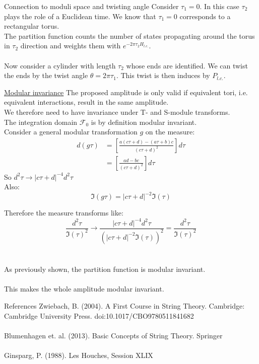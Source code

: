 \documentclass[11pt,aspectratio=169]{beamer}
\begin{document}
\begin{frame}
	
	\begin{block}{Connection to moduli space and twisting angle}
		Consider $\tau_1 = 0$. In this case $\tau_2$ plays the role of a Euclidean time. We know that $\tau_1 = 0$ corresponds to a rectangular torus.
	\\
	The partition function counts the number of states propagating around the torus in $\tau_2$ direction and weights them with $e^{-2\pi\tau_2H_{l.c.}}$.
	\\~\\
	Now consider a cylinder with length $\tau_2$ whose ends are identified. We can twist the ends by the twist angle $\theta = 2\pi \tau_1$. This twist is then induces by $P_{l.c.}$.
	\end{block}
	
\end{frame}

\begin{frame}{\underline{Modular invariance}}
	The proposed amplitude is only valid if equivalent tori, i.e. equivalent interactions, result in the same amplitude. 
	\\
	We therefore need to have invariance under T- and S-module transforms.
	\\
	The integration domain $\mathcal{F}_0$ is by definition modular invariant. 
	\\
	Consider a general modular transformation $g$ on the measure:
	\begin{align*}
		d(g\tau) &=  [\frac{a(c\tau + d) - (a\tau + b)c}{(c\tau + d)^2}]d\tau \\
		&= [\frac{ad - bc}{(c\tau + d)^2}]d\tau
	\end{align*}
	So $d^2\tau \rightarrow |c\tau + d|^{-4}d^2\tau$
	\\
	Also: 
	\begin{equation}
		\Im(g\tau) = |c\tau + d|^{-2}\Im(\tau)
	\end{equation}
	
	
\end{frame}

\begin{frame}
	Therefore the measure transforms like:
	\begin{equation}
		\frac{d^2\tau}{\Im(\tau)^2} \rightarrow \frac{|c\tau + d|^{-4}d^2\tau}{(|c\tau + d|^{-2}\Im(\tau))^2} = \frac{d^2\tau}{\Im(\tau)^2}
	\end{equation}
	\\~\\
	As previously shown, the partition function is modular invariant. 
	\\~\\
	This makes the whole amplitude modular invariant.
\end{frame}

\begin{frame}{References}
	Zwiebach, B. (2004). A First Course in String Theory. Cambridge: Cambridge University Press. doi:10.1017/CBO9780511841682
	\\~\\
	Blumenhagen et. al. (2013). Basic Concepts of String Theory. Springer
	\\~\\
	Ginsparg, P. (1988). Les Houches, Session XLIX
\end{frame}
\end{document}

